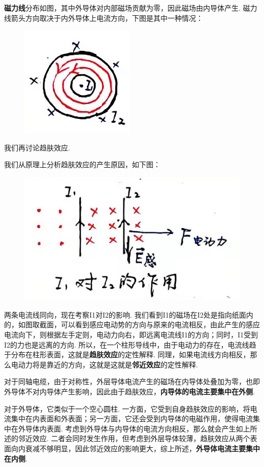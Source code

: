 \documentclass[UTF8]{ctexart}
\begin{document}
\textbf{磁力线}分布如图，其中外导体对内部磁场贡献为零，因此磁场由内导体产生. 磁力线箭头方向取决于内外导体上电流方向，下图是其中一种情况：
\begin{figure}[H]\begin{center}
    \includegraphics[scale=0.6]{15.PNG}
\end{center}\end{figure}
我们再讨论趋肤效应.\par
我们从原理上分析趋肤效应的产生原因，如下图：
\begin{figure}[H]\begin{center}
    \includegraphics[scale=0.6]{16.PNG}
\end{center}\end{figure}
两条电流线同向，现在考察I1对I2的影响. 我们看到I1的磁场在I2处是指向纸面内的，如图取截面，可以看到感应电动势的方向与原来的电流相反，由此产生的感应电流向下，则根据左手定则，电动力向右，即远离电流线I1的方向；同时，I1受到I2的力也是远离的方向. 所以，在一个柱形导线中，由于电动力的存在，电流线趋于分布在柱形表面，这就是\textbf{趋肤效应}的定性解释. 同理，如果电流线方向相反，那么电动力将是靠近的方向，这就是这就是\textbf{邻近效应}的定性解释.\par
对于同轴电缆，由于对称性，外层导体电流产生的磁场在内导体处叠加为零，也即外导体不对内导体产生影响，因此由于趋肤效应，\textbf{内导体的电流主要集中在外侧}.\par
对于外导体，它类似于一个空心圆柱. 一方面，它受到自身趋肤效应的影响，将电流集中在内表面和外表面；另一方面，它还会受到内导体的电磁作用，使得电流集中在外导体内表面. 考虑到外导体与内导体的电流方向相反，那么就会产生如上所述的邻近效应. 二者会同时发生作用，但考虑到外层导体较薄，趋肤效应从两个表面向内衰减不够明显，因此邻近效应的影响更大，综上所述，\textbf{外导体电流主要集中在内侧}.
\end{document}
